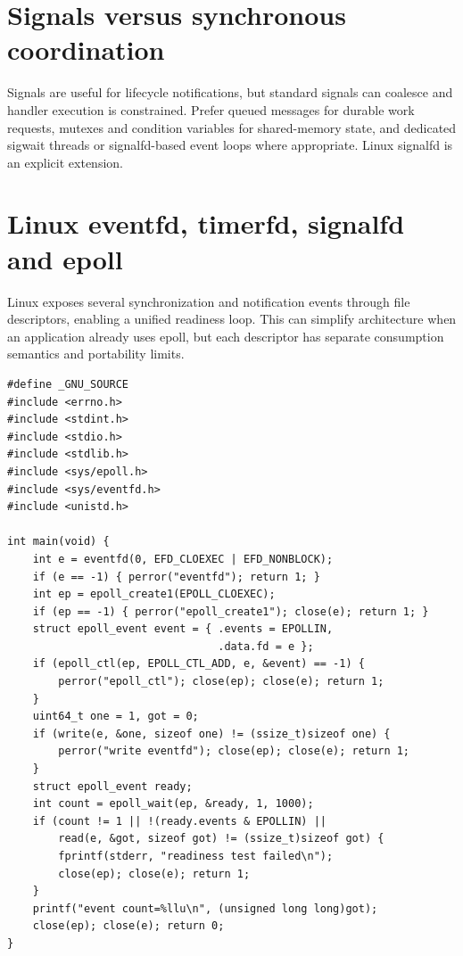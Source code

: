 \documentclass[11pt,letterpaper,oneside]{report}
\begin{document}
\chapter{Signals versus synchronous coordination}
Signals are useful for lifecycle notifications, but standard signals can coalesce and handler execution is constrained. Prefer queued messages for durable work requests, mutexes and condition variables for shared-memory state, and dedicated sigwait threads or signalfd-based event loops where appropriate. Linux signalfd is an explicit extension.

\chapter{Linux eventfd, timerfd, signalfd and epoll}
Linux exposes several synchronization and notification events through file descriptors, enabling a unified readiness loop. This can simplify architecture when an application already uses epoll, but each descriptor has separate consumption semantics and portability limits.

\begin{lstlisting}
#define _GNU_SOURCE
#include <errno.h>
#include <stdint.h>
#include <stdio.h>
#include <stdlib.h>
#include <sys/epoll.h>
#include <sys/eventfd.h>
#include <unistd.h>

int main(void) {
    int e = eventfd(0, EFD_CLOEXEC | EFD_NONBLOCK);
    if (e == -1) { perror("eventfd"); return 1; }
    int ep = epoll_create1(EPOLL_CLOEXEC);
    if (ep == -1) { perror("epoll_create1"); close(e); return 1; }
    struct epoll_event event = { .events = EPOLLIN,
                                 .data.fd = e };
    if (epoll_ctl(ep, EPOLL_CTL_ADD, e, &event) == -1) {
        perror("epoll_ctl"); close(ep); close(e); return 1;
    }
    uint64_t one = 1, got = 0;
    if (write(e, &one, sizeof one) != (ssize_t)sizeof one) {
        perror("write eventfd"); close(ep); close(e); return 1;
    }
    struct epoll_event ready;
    int count = epoll_wait(ep, &ready, 1, 1000);
    if (count != 1 || !(ready.events & EPOLLIN) ||
        read(e, &got, sizeof got) != (ssize_t)sizeof got) {
        fprintf(stderr, "readiness test failed\n");
        close(ep); close(e); return 1;
    }
    printf("event count=%llu\n", (unsigned long long)got);
    close(ep); close(e); return 0;
}
\end{lstlisting}
\end{document}
